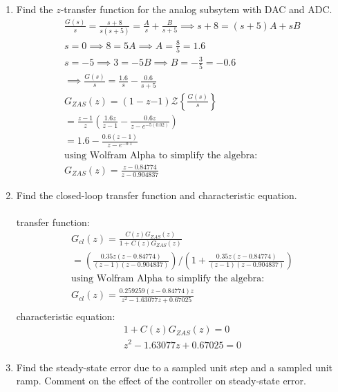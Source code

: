\documentclass[12pt]{article}
\newenvironment{problem}[2][Problem]{\begin{trivlist}
\item[\hskip \labelsep {\bfseries #1}\hskip \labelsep {\bfseries #2.}]}{\end{trivlist}}
\begin{document}
\begin{problem}{1}
    \begin{enumerate}[label=(\alph*)]
        \item Find the $z$-transfer function for the analog subsytem with DAC and ADC.
        \begin{align*}
            \frac{G(s)}{s} = \frac{s+8}{s(s+5)} = \frac{A}{s} + \frac{B}{s+5} \implies s+8 = (s+5)A + sB\\
            s = 0 \implies 8 = 5A \implies A = \frac{8}{5}=1.6\\
            s = -5 \implies 3 = -5B \implies B = -\frac{3}{5}=-0.6\\ 
            \implies \frac{G(s)}{s} = \frac{1.6}{s} - \frac{0.6}{s+5}\\
            G_{ZAS}(z) = (1-z{-1})\mathcal{Z}\left\{\frac{G(s)}{s}\right\}\\
            = \frac{z-1}{z}\left(\frac{1.6z}{z-1}-\frac{0.6z}{z-e^{-5(0.02)}}\right)\\
            = 1.6 - \frac{0.6(z-1)}{z-e^{-0.1}}\\
            \text{using Wolfram Alpha to simplify the algebra:}\\
            G_{ZAS}(z)= \frac{z-0.84774}{z-0.904837}
        \end{align*}
        \item Find the closed-loop transfer function and characteristic equation.\\\\
        transfer function:
        \begin{align*}
            G_{cl}(z) = \frac{C(z)G_{ZAS}(z)}{1+C(z)G_{ZAS}(z)}\\
            = \left(\frac{0.35z(z-0.84774)}{(z-1)(z-0.904837)}\right)/\left(1+\frac{0.35z(z-0.84774)}{(z-1)(z-0.904837)}\right)\\
            \text{using Wolfram Alpha to simplify the algebra:}\\
            G_{cl}(z)= \frac{0.259259(z-0.84774)z}{z^2-1.63077z + 0.67025}\\
        \end{align*}
        characteristic equation:
        \begin{align*}
            1+C(z)G_{ZAS}(z) = 0\\
            z^2-1.63077z + 0.67025 = 0
        \end{align*}
        \item Find the steady-state error due to a sampled unit step and a sampled unit ramp. Comment on the effect of the controller on steady-state error.

\end{enumerate}
\end{problem}
\end{document}
